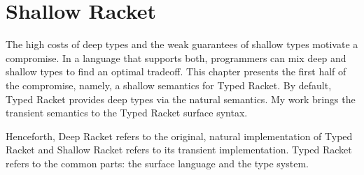 \documentclass[ twoside,open=right,titlepage,numbers=noenddot,headinclude,%
                footinclude=true,cleardoublepage=empty,abstract=off,
                BCOR=5mm,paper=a4,fontsize=11pt,%
                ngerman,american,%
                parts,pdfspacing]{scrreprt}
\newcommand{\sectionNewpage}{}
\let\SOriginalthesubsection\thesubsection
\newcommand{\Ssection}[2]{\section[#1]{#2}\let\thesubsection\SOriginalthesubsection}
\renewcommand{\Ssection}[2]{\chapter[#1]{#2}}
\begin{document}

\sectionNewpage

\Ssection{Shallow Racket}{Shallow Racket}\label{t:x28part_x22chapx3atransientx22x29}

The high costs of deep types and the weak guarantees of shallow types motivate a compromise.
In a language that supports both, programmers can mix deep and
 shallow types to find an optimal tradeoff.
This chapter presents the first half of the compromise, namely, a shallow semantics for Typed Racket.
By default, Typed Racket provides deep types via the natural semantics.
My work brings the transient semantics to the Typed Racket surface syntax.

Henceforth, Deep Racket refers to the original, natural implementation
 of Typed Racket and Shallow Racket refers to its transient implementation.
Typed Racket refers to the common parts: the surface language and the type system.
\end{document}
